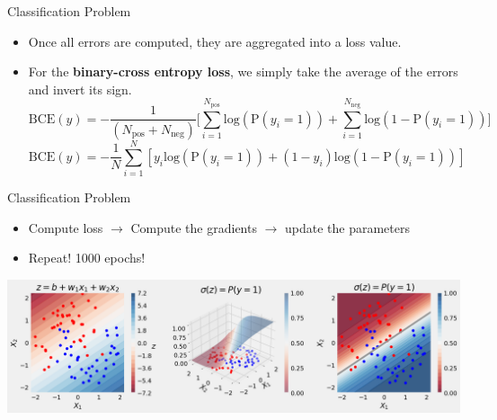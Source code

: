 \documentclass[pdflatex,compress,mathserif]{beamer}
\begin{document}
\begin{frame}{Classification Problem}
	\begin{itemize}
		\item Once all errors are computed, they are aggregated into a loss value.
		\item For the \textbf{binary-cross entropy loss}, we simply take the average of the errors and invert its sign.
		\small
		$$
		\text{BCE}(y)={-\frac{1}{(N_{\text{pos}}+N_{\text{neg}})}\Bigg[{\sum_{i=1}^{N_{\text{pos}}}{\text{log}(\text{P}(y_i=1))} + \sum_{i=1}^{N_{\text{neg}}}{\text{log}(1 - \text{P}(y_i=1))}}\Bigg]}
		$$
		$$
		\text{BCE}(y)={-\frac{1}{N}\sum_{i=1}^{N}{\left[y_i \text{log}(\text{P}(y_i=1)) + (1-y_i) \text{log}(1-\text{P}(y_i=1))\right]}}
		$$
	\end{itemize}
\end{frame}

\begin{frame}{Classification Problem}
	\begin{itemize}
		\item Compute loss $\rightarrow$ Compute the gradients $\rightarrow$ update the parameters
		\item Repeat! 1000 epochs!
	\end{itemize}
	\begin{center}
		\includegraphics[width=\linewidth]{img/22}
	\end{center}
\end{frame}
\end{document}
